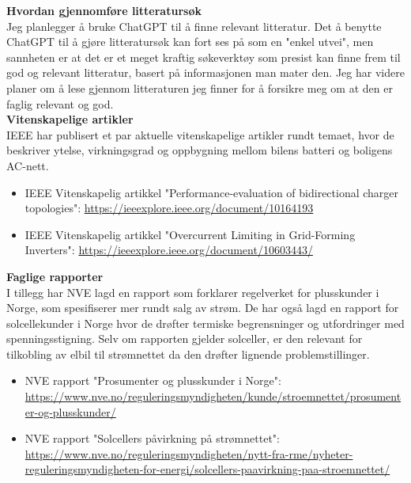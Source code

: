 \documentclass{article}
\begin{document}
\textbf{Hvordan gjennomføre litteratursøk} \\
Jeg planlegger å bruke ChatGPT \cite{chatgpt} til å finne relevant litteratur. Det å benytte ChatGPT til å gjøre litteratursøk kan fort ses på som en "enkel utvei", men sannheten er at det er et meget kraftig søkeverktøy som presist kan finne frem til god og relevant litteratur, basert på informasjonen man mater den. Jeg har videre planer om å lese gjennom litteraturen jeg finner for å forsikre meg om at den er faglig relevant og god. 
\\

\textbf{Vitenskapelige artikler} \\
IEEE har publisert et par aktuelle vitenskapelige artikler rundt temaet, hvor de beskriver ytelse, virkningsgrad og oppbygning mellom bilens batteri og boligens AC-nett. 

\begin{itemize}
    \item IEEE Vitenskapelig artikkel "Performance-evaluation of bidirectional charger topologies": \url{https://ieeexplore.ieee.org/document/10164193} \cite{IEEE_1}
    \item IEEE Vitenskapelig artikkel "Overcurrent Limiting in Grid-Forming Inverters":
    \url{https://ieeexplore.ieee.org/document/10603443/} \cite{IEEE_2}
\end{itemize}

\textbf{Faglige rapporter} \\
I tillegg har NVE lagd en rapport som forklarer regelverket for plusskunder i Norge, som spesifiserer mer rundt salg av strøm. De har også lagd en rapport for solcellekunder i Norge hvor de drøfter termiske begrensninger og utfordringer med spenningsstigning. Selv om rapporten gjelder solceller, er den relevant for tilkobling av elbil til strømnettet da den drøfter lignende problemstillinger. 

\begin{itemize}
    \item NVE rapport "Prosumenter og plusskunder i Norge": \url{https://www.nve.no/reguleringsmyndigheten/kunde/stroemnettet/prosumenter-og-plusskunder/} \cite{NVE_plusskunder}

    \item NVE rapport "Solcellers påvirkning på strømnettet": \url{https://www.nve.no/reguleringsmyndigheten/nytt-fra-rme/nyheter-reguleringsmyndigheten-for-energi/solcellers-paavirkning-paa-stroemnettet/} \cite{NVE_solcelle}
\end{itemize}
\end{document}
